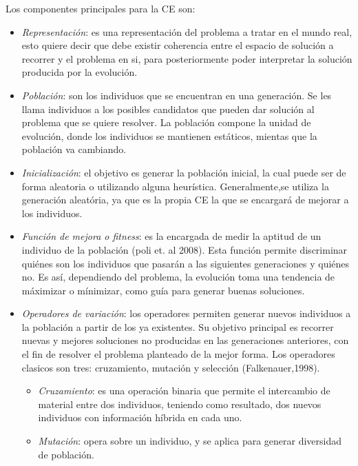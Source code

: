 Los componentes principales para la CE son:

\begin{itemize}
\item \textit{Representación}: es una representación del problema a tratar en el mundo real, esto quiere decir que debe existir coherencia entre el espacio de solución a recorrer y el problema en si, para posteriormente poder interpretar la solución producida por la evolución.

\item \textit{Población}: son los individuos que se encuentran en una generación. Se les llama individuos a los posibles candidatos que pueden dar solución al problema que se quiere resolver. La población compone la unidad de evolución, donde los individuos se mantienen estáticos, mientas que la población va cambiando.

\item \textit{Inicialización}: el objetivo es generar la población inicial, la cual puede ser de forma aleatoria o utilizando alguna heurística. Generalmente,se utiliza la generación aleatória, ya que es la propia CE la que se encargará de mejorar a los individuos.

\item \textit{Función de mejora o fitness}: es la encargada de medir la aptitud de un individuo de la población (poli et. al 2008). Esta función permite discriminar quiénes son los individuos que pasarán a las siguientes generaciones y quiénes no. Es así, dependiendo del problema, la evolución toma una tendencia de máximizar o mínimizar, como guía para generar buenas soluciones.

\item \textit{Operadores de variación}: los operadores permiten generar nuevos individuos a la población a partir de los ya existentes. Su objetivo principal es recorrer nuevas y mejores soluciones no producidas en las generaciones anteriores, con el fin de resolver el problema planteado de la mejor forma.
Los operadores clasicos son tres: cruzamiento, mutación y selección (Falkenauer,1998).
\begin{itemize}

\item \textit{Cruzamiento}: es una operación binaria que permite el intercambio de material entre dos individuos, teniendo como resultado, dos nuevos individuos con información híbrida en cada uno.

\item \textit{Mutación}: opera sobre un individuo, y se aplica para generar diversidad de población.


\end{itemize}
\end{itemize}
